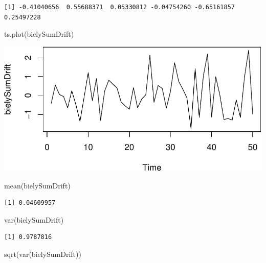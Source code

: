 \documentclass[
  letterpaper,
  DIV=11,
  numbers=noendperiod]{scrreprt}
\newenvironment{Shaded}{\begin{snugshade}}{\end{snugshade}}
\newcommand{\FunctionTok}[1]{\textcolor[rgb]{0.28,0.35,0.67}{#1}}
\newcommand{\NormalTok}[1]{\textcolor[rgb]{0.00,0.23,0.31}{#1}}
\begin{document}
\begin{verbatim}
[1] -0.41040656  0.55688371  0.05330812 -0.04754260 -0.65161857  0.25497228
\end{verbatim}

\begin{Shaded}
\begin{Highlighting}[]
\FunctionTok{ts.plot}\NormalTok{(bielySumDrift)}
\end{Highlighting}
\end{Shaded}

\includegraphics{prednaska3_NahodnaPrechadzkaStacionarita_files/figure-pdf/unnamed-chunk-10-1.pdf}

\begin{Shaded}
\begin{Highlighting}[]
\FunctionTok{mean}\NormalTok{(bielySumDrift)}
\end{Highlighting}
\end{Shaded}

\begin{verbatim}
[1] 0.04609957
\end{verbatim}

\begin{Shaded}
\begin{Highlighting}[]
\FunctionTok{var}\NormalTok{(bielySumDrift)}
\end{Highlighting}
\end{Shaded}

\begin{verbatim}
[1] 0.9787816
\end{verbatim}

\begin{Shaded}
\begin{Highlighting}[]
\FunctionTok{sqrt}\NormalTok{(}\FunctionTok{var}\NormalTok{(bielySumDrift))}
\end{Highlighting}
\end{Shaded}
\end{document}
